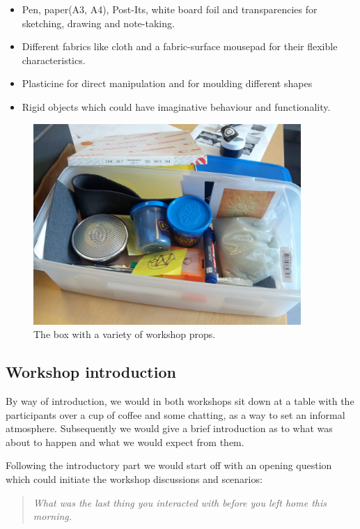 \begin{itemize}
  \item{Pen, paper(A3, A4), Post-Its, white board foil and transparencies for sketching, drawing and note-taking.}
  \item{Different fabrics like cloth and a fabric-surface mousepad for their flexible characteristics.}
  \item{Plasticine for direct manipulation and for moulding different shapes}
  \item{Rigid objects which could have imaginative behaviour and functionality.}
\end{itemize}

\begin{figure}[hb]
  \centering
    \includegraphics[width=4in]{workshops/props-box}
    \caption[A box with a variety of workshop props.] %
  {The box with a variety of workshop props.} %
  \label{ch:workshops:props-box}
\end{figure}

\subsection{Workshop introduction}
\label{ch:workshops:approach:introduction}
By way of introduction, we would in both workshops sit down at a table with the participants over a cup of coffee and some chatting, as a way to set an informal atmosphere.
Subsequently we would give a brief introduction as to what was about to happen and what we would expect from them.

Following the introductory part we would start off with an opening question which could initiate the workshop discussions and scenarios:

\begin{quotation}
  \emph{What was the last thing you interacted with before you left home this morning.}
\end{quotation}


